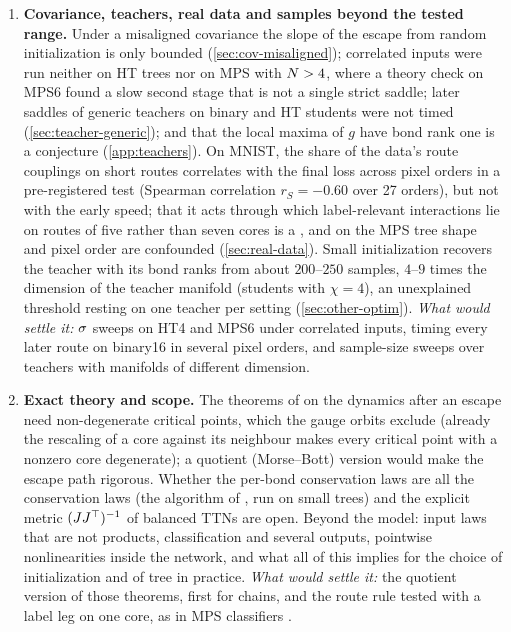 \begin{enumerate}[label=\arabic*.,leftmargin=*,itemsep=4pt]
    against $26$ from a commuting-pair estimate); the rate at which noise erases learned components near
    the stability limit, and whether noise can revive a dead route, are open (\cref{sec:other-optim}).
    \emph{What would settle it:} a sign-flow analysis of the route equations with and without $\epsilon$,
    and the top Lyapunov exponent of the linearized route block under noise, tested on SGD runs started
    from stalled states.
  \item \textbf{Covariance, teachers, real data and samples beyond the tested range.} Under a misaligned
    covariance the slope of the escape from random initialization is only bounded
    (\cref{sec:cov-misaligned}); correlated inputs were run neither on HT trees nor on MPS with $N>4$,
    where a theory check on MPS6 found a slow second stage that is not a single strict saddle; later
    saddles of generic teachers on binary and HT students were not timed (\cref{sec:teacher-generic}); and
    that the local maxima of $g$ have bond rank one is a conjecture (\cref{app:teachers}). On MNIST, the
    share of the data's route couplings on short routes correlates with the final loss across pixel orders
    in a pre-registered test (Spearman correlation $r_S=-0.60$ over 27 orders), but not with the early
    speed; that it acts through which label-relevant interactions lie on routes of five rather than seven
    cores is a \conjecture, and on the MPS tree shape and pixel order are confounded (\cref{sec:real-data}).
    Small initialization recovers the teacher with its bond ranks from about $200$--$250$ samples, $4$--$9$
    times the dimension of the teacher manifold (students with $\chi=4$), an unexplained threshold resting on one teacher per
    setting (\cref{sec:other-optim}). \emph{What would settle it:} $\sigma$ sweeps on HT4 and MPS6 under
    correlated inputs, timing every later route on binary16 in several pixel orders, and sample-size sweeps
    over teachers with manifolds of different dimension.
  \item \textbf{Exact theory and scope.} The theorems of \citet{kumar2025towards} on the dynamics after an
    escape need non-degenerate critical points, which the gauge orbits exclude (already the rescaling of a
    core against its neighbour makes every critical point with a nonzero core degenerate); a quotient
    (Morse--Bott) version would make the escape path rigorous. Whether the per-bond conservation laws are
    all the conservation laws (the algorithm of \citealp{marcotte2023abide}, run on small trees) and the
    explicit metric $(JJ^{\top})^{-1}$ of balanced TTNs are open. Beyond the model: input laws that are not
    products, classification and several outputs, pointwise nonlinearities inside the network, and what all
    of this implies for the choice of initialization and of tree in practice. \emph{What would settle it:}
    the quotient version of those theorems, first for chains, and the route rule tested with a label leg on
    one core, as in MPS classifiers \citep{stoudenmire2016supervised}.
\end{enumerate}
